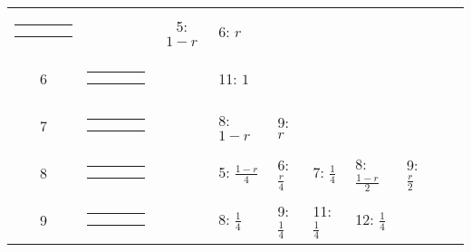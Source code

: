 \begin{center}
\begin{tabular}{ccclllllll}
{\renewcommand{\tabcolsep}{0.5mm}
\parbox[b][3mm][c]{12mm}{
\begin{tabular}{|p{2mm}|p{2mm}||p{2mm}|p{2mm}|} \hline
$\bullet$ &           &           &           \\
$\bullet$ &           &           &           \\ \hline
\end{tabular}}}
&
& 5: $1-r$
& 6: $r$
& & & & & \\
6 &
{\renewcommand{\arraystretch}{0.3}
\renewcommand{\tabcolsep}{0.5mm}
\parbox[b][3mm][c]{12mm}{
\begin{tabular}{|p{2mm}|p{2mm}||p{2mm}|p{2mm}|} \hline
$\bullet$ &           &           &           \\
          & $\bullet$ &           &           \\ \hline
\end{tabular}}}
&
& 11: $1$
& & & & & & \\
7 &
{\renewcommand{\arraystretch}{0.3}
\renewcommand{\tabcolsep}{0.5mm}
\parbox[b][3mm][c]{12mm}{
\begin{tabular}{|p{2mm}|p{2mm}||p{2mm}|p{2mm}|} \hline
$\bullet$ & $\bullet$ &           &           \\
$\bullet$ &           &           &           \\ \hline
\end{tabular}}}
&
& 8: $1-r$
& 9: $r$
& & & & & \\
8 &
{\renewcommand{\arraystretch}{0.3}
\renewcommand{\tabcolsep}{0.5mm}
\parbox[b][3mm][c]{12mm}{
\begin{tabular}{|p{2mm}|p{2mm}||p{2mm}|p{2mm}|} \hline
$\bullet$ &           & $\bullet$ &           \\
$\bullet$ &           &           &           \\ \hline
\end{tabular}}}
&
& 5: $\frac{1-r}{4}$
& 6: $\frac{r}{4}$
& 7: $\frac{1}{4}$
& 8: $\frac{1-r}{2}$
& 9: $\frac{r}{2}$
& & \\
9 &
{\renewcommand{\arraystretch}{0.3}
\renewcommand{\tabcolsep}{0.5mm}
\parbox[b][3mm][c]{12mm}{
\begin{tabular}{|p{2mm}|p{2mm}||p{2mm}|p{2mm}|} \hline
$\bullet$ &           & $\bullet$ &           \\
          & $\bullet$ &           &           \\ \hline
\end{tabular}}}
&
& 8: $\frac{1}{4}$
& 9: $\frac{1}{4}$
& 11: $\frac{1}{4}$
& 12: $\frac{1}{4}$
& & & \\

\end{tabular}
\end{center}
